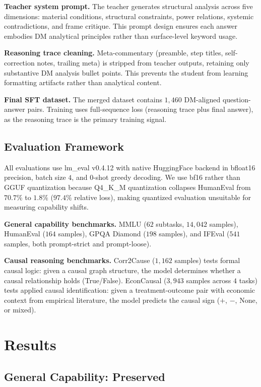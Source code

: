 \documentclass{article}
\begin{document}
\textbf{Teacher system prompt.} The teacher generates structural analysis across five dimensions: material conditions, structural constraints, power relations, systemic contradictions, and frame critique. This prompt design ensures each answer embodies DM analytical principles rather than surface-level keyword usage.

\textbf{Reasoning trace cleaning.} Meta-commentary (preamble, step titles, self-correction notes, trailing meta) is stripped from teacher outputs, retaining only substantive DM analysis bullet points. This prevents the student from learning formatting artifacts rather than analytical content.

\textbf{Final SFT dataset.} The merged dataset contains $1{,}460$ DM-aligned question-answer pairs. Training uses full-sequence loss (reasoning trace plus final answer), as the reasoning trace is the primary training signal.

\subsection{Evaluation Framework}

All evaluations use lm\_eval v0.4.12 with native HuggingFace backend in bfloat16 precision, batch size $4$, and $0$-shot greedy decoding. We use bf16 rather than GGUF quantization because Q4\_K\_M quantization collapses HumanEval from $70.7\%$ to $1.8\%$ ($97.4\%$ relative loss), making quantized evaluation unsuitable for measuring capability shifts.

\textbf{General capability benchmarks.} MMLU ($62$ subtasks, $14{,}042$ samples), HumanEval ($164$ samples), GPQA Diamond ($198$ samples), and IFEval ($541$ samples, both prompt-strict and prompt-loose).

\textbf{Causal reasoning benchmarks.} Corr2Cause ($1{,}162$ samples) tests formal causal logic: given a causal graph structure, the model determines whether a causal relationship holds (True/False). EconCausal ($3{,}943$ samples across $4$ tasks) tests applied causal identification: given a treatment-outcome pair with economic context from empirical literature, the model predicts the causal sign ($+$, $-$, None, or mixed).

\section{Results}

\subsection{General Capability: Preserved}
\end{document}
